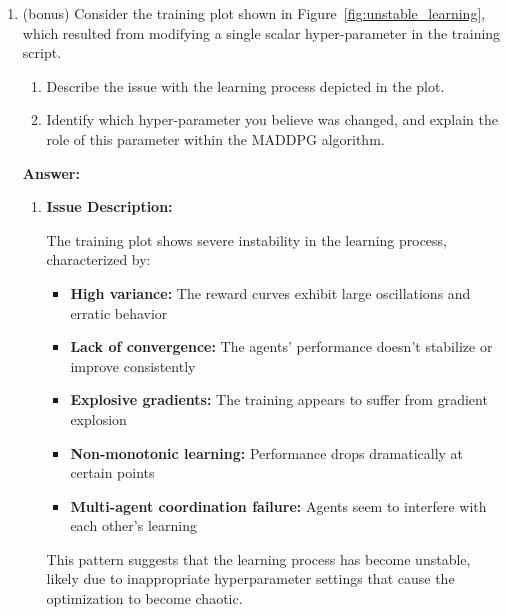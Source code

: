 \documentclass[12pt]{article}
\begin{document}
{{{{{{\begin{enumerate}
    \textbf{Conclusion:}
    
    Target networks are essential because they provide a stable learning target for the critic, preventing the moving target problem that would otherwise destabilize the entire learning process. This is particularly important in multi-agent settings where multiple policies must coordinate their learning.

    \item (bonus) Consider the training plot shown in Figure~\ref{fig:unstable_learning}, which resulted from modifying a single scalar hyper-parameter in the training script.
    \begin{enumerate}
        \item Describe the issue with the learning process depicted in the plot.
        \item Identify which hyper-parameter you believe was changed, and explain the role of this parameter within the MADDPG algorithm.
    \end{enumerate}
    
    \textbf{Answer:}
    
    \begin{enumerate}
        \item \textbf{Issue Description:}
        
        The training plot shows severe instability in the learning process, characterized by:
        
        \begin{itemize}
            \item \textbf{High variance:} The reward curves exhibit large oscillations and erratic behavior
            \item \textbf{Lack of convergence:} The agents' performance doesn't stabilize or improve consistently
            \item \textbf{Explosive gradients:} The training appears to suffer from gradient explosion
            \item \textbf{Non-monotonic learning:} Performance drops dramatically at certain points
            \item \textbf{Multi-agent coordination failure:} Agents seem to interfere with each other's learning
        \end{itemize}
        
        This pattern suggests that the learning process has become unstable, likely due to inappropriate hyperparameter settings that cause the optimization to become chaotic.
        

\end{enumerate}
\end{enumerate}}}}}}}
\end{document}
